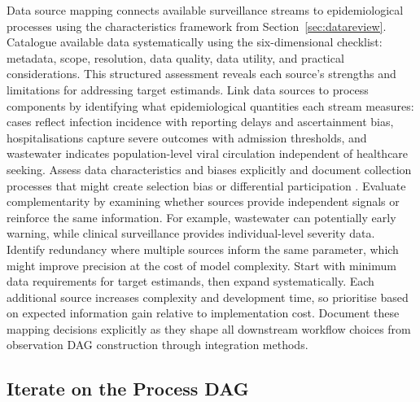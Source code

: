 \documentclass{article}
\begin{document}
Data source mapping connects available surveillance streams to epidemiological processes using the characteristics framework from Section~\ref{sec:datareview}.
Catalogue available data systematically using the six-dimensional checklist: metadata, scope, resolution, data quality, data utility, and practical considerations.
This structured assessment reveals each source's strengths and limitations for addressing target estimands.
Link data sources to process components by identifying what epidemiological quantities each stream measures: cases reflect infection incidence with reporting delays and ascertainment bias, hospitalisations capture severe outcomes with admission thresholds, and wastewater indicates population-level viral circulation independent of healthcare seeking.
Assess data characteristics and biases explicitly and document collection processes that might create selection bias or differential participation \citep{digitale2022tutorial}.
Evaluate complementarity by examining whether sources provide independent signals or reinforce the same information.
For example, wastewater can potentially early warning, while clinical surveillance provides individual-level severity data.
Identify redundancy where multiple sources inform the same parameter, which might improve precision at the cost of model complexity.
Start with minimum data requirements for target estimands, then expand systematically.
Each additional source increases complexity and development time, so prioritise based on expected information gain relative to implementation cost.
Document these mapping decisions explicitly as they shape all downstream workflow choices from observation DAG construction through integration methods.

\subsection{Iterate on the Process DAG}
\end{document}
